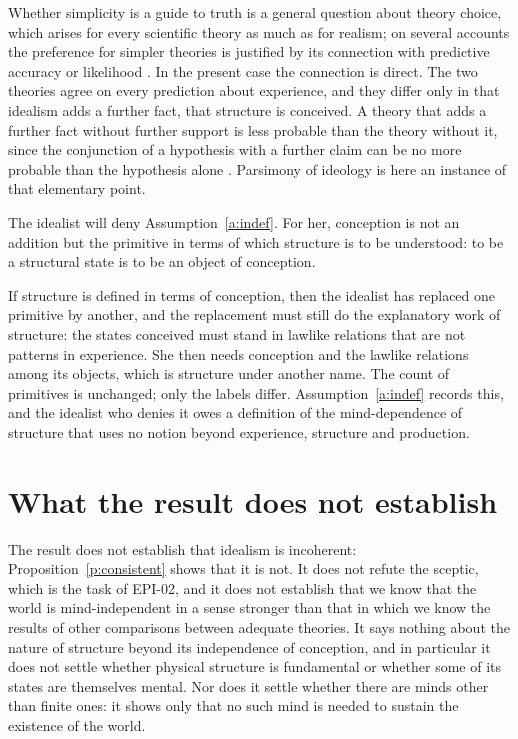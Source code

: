 \documentclass{situationist-preprint}
\begin{document}
\begin{reply}
Whether simplicity is a guide to truth is a general question about theory choice, which arises for every scientific theory as much as for realism; on several accounts the preference for simpler theories is justified by its connection with predictive accuracy or likelihood \citep{Sober2015}. In the present case the connection is direct. The two theories agree on every prediction about experience, and they differ only in that idealism adds a further fact, that structure is conceived. A theory that adds a further fact without further support is less probable than the theory without it, since the conjunction of a hypothesis with a further claim can be no more probable than the hypothesis alone \citep{Huemer2009}. Parsimony of ideology is here an instance of that elementary point.
\end{reply}

\begin{objection}
The idealist will deny Assumption~\ref{a:indef}. For her, conception is not an addition but the primitive in terms of which structure is to be understood: to be a structural state is to be an object of conception.
\end{objection}

\begin{reply}
If structure is defined in terms of conception, then the idealist has replaced one primitive by another, and the replacement must still do the explanatory work of structure: the states conceived must stand in lawlike relations that are not patterns in experience. She then needs conception and the lawlike relations among its objects, which is structure under another name. The count of primitives is unchanged; only the labels differ. Assumption~\ref{a:indef} records this, and the idealist who denies it owes a definition of the mind-dependence of structure that uses no notion beyond experience, structure and production.
\end{reply}

\section{What the result does not establish}

The result does not establish that idealism is incoherent: Proposition~\ref{p:consistent} shows that it is not. It does not refute the sceptic, which is the task of EPI-02, and it does not establish that we know that the world is mind-independent in a sense stronger than that in which we know the results of other comparisons between adequate theories. It says nothing about the nature of structure beyond its independence of conception, and in particular it does not settle whether physical structure is fundamental or whether some of its states are themselves mental. Nor does it settle whether there are minds other than finite ones: it shows only that no such mind is needed to sustain the existence of the world.
\end{document}
